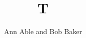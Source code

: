 \documentclass{acmart}
\begin{document}
\title{T}
\author{Ann Able and Bob Baker}
\maketitle
\end{document}
